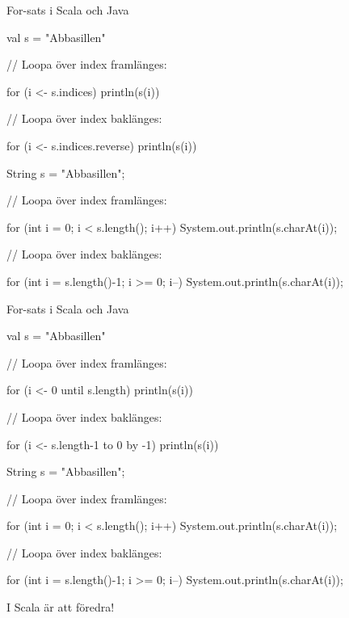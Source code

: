 \begin{Slide}{For-sats i Scala och Java}
\begin{multicols}{2}
\begin{CodeSmall}[basicstyle=\ttfamily\SlideFontSize{6}{8}]
val s = "Abbasillen"

// Loopa över index framlänges:

for (i <- s.indices) {
  println(s(i))
}

// Loopa över index baklänges:

for (i <- s.indices.reverse) {
  println(s(i))
}
\end{CodeSmall}

\columnbreak

\begin{CodeSmall}[language=Java,basicstyle=\ttfamily\SlideFontSize{6}{8}]
String s = "Abbasillen";

// Loopa över index framlänges:

for (int i = 0; i < s.length(); i++) {
    System.out.println(s.charAt(i));
}

// Loopa över index baklänges:

for (int i = s.length()-1; i >= 0; i--) {
    System.out.println(s.charAt(i));
}
\end{CodeSmall}
\end{multicols}
\end{Slide}



\begin{Slide}{For-sats i Scala och Java}
\begin{multicols}{2}
\begin{CodeSmall}[basicstyle=\ttfamily\SlideFontSize{6}{8}]
val s = "Abbasillen"

// Loopa över index framlänges:

for (i <- 0 until s.length) {
  println(s(i))
}

// Loopa över index baklänges:

for (i <- s.length-1 to 0 by -1) {
  println(s(i))
}
\end{CodeSmall}

\columnbreak

\begin{CodeSmall}[language=Java,basicstyle=\ttfamily\SlideFontSize{6}{8}]
String s = "Abbasillen";

// Loopa över index framlänges:

for (int i = 0; i < s.length(); i++) {
    System.out.println(s.charAt(i));
}

// Loopa över index baklänges:

for (int i = s.length()-1; i >= 0; i--) {
    System.out.println(s.charAt(i));
}
\end{CodeSmall}
\end{multicols}
I Scala är  att föredra!
\end{Slide}



